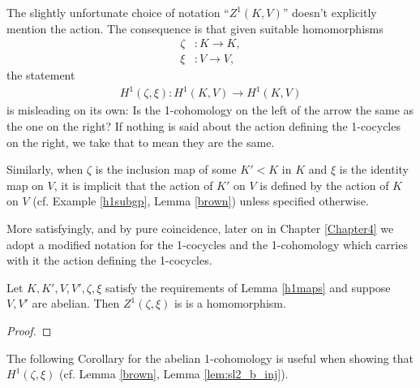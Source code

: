\begin{remark}
	The slightly unfortunate choice of notation ``$Z^1(K, V)$'' doesn't explicitly mention the action. The consequence is that given suitable homomorphisms
	\begin{align*}
		\zeta&:K \rightarrow K, \\
		\xi&: V \rightarrow V,
	\end{align*}
	the statement
	\begin{align*}
		H^1(\zeta, \xi):H^1(K, V) \rightarrow H^1(K, V)
	\end{align*}
	is misleading on its own: Is the 1-cohomology on the left of the arrow the same as the one on the right? If nothing is said about the action defining the 1-cocycles on the right, we take that to mean they are the same.

	Similarly, when $\zeta$ is the inclusion map of some $K' < K$ in $K$ and $\xi$ is the identity map on $V$, it is implicit that the action of $K'$ on $V$ is defined by the action of $K$ on $V$ (cf. Example \ref{h1subgp}, Lemma \ref{brown}) unless specified otherwise.

	More satisfyingly, and by pure coincidence, later on in Chapter \ref{Chapter4} we adopt a modified notation for the 1-cocycles and the 1-cohomology which carries with it the action defining the 1-cocycles.
\end{remark}

\begin{corollary} \label{zlinear} Let $K,K',V,V',\zeta,\xi$ satisfy the requirements of Lemma \ref{h1maps} and suppose $V,V'$ are abelian. Then $Z^1(\zeta, \xi)$ is is a homomorphism.
\end{corollary}
\begin{proof}
\end{proof}

The following Corollary for the abelian 1-cohomology is useful when showing that $H^1(\zeta, \xi)$ (cf. Lemma \ref{brown}, Lemma \ref{lem:sl2_b_inj}).

